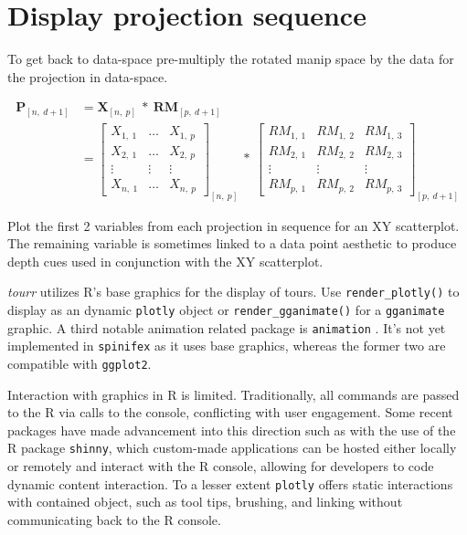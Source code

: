\documentclass{monashthesis}
\begin{document}
\section{Display projection
sequence}\label{display-projection-sequence-1}

To get back to data-space pre-multiply the rotated manip space by the
data for the projection in data-space.

\begin{align}
  \textbf{P}_{[n,~d+1]}
    &= \textbf{X}_{[n,~p]} ~*~ \textbf{RM}_{[p,~d+1]} \\
    &=
      \begin{bmatrix}
          X_{1,~1} & \dots & X_{1,~p} \\
          X_{2,~1} & \dots & X_{2,~p} \\
          \vdots   & \vdots & \vdots  \\
          X_{n,~1} & \dots & X_{n,~p}
      \end{bmatrix}_{[n,~p]}
      ~*~
      \begin{bmatrix}
        RM_{1,~1} & RM_{1,~2} & RM_{1,~3} \\
        RM_{2,~1} & RM_{2,~2} & RM_{2,~3} \\
        \vdots     & \vdots     & \vdots     \\
        RM_{p,~1} & RM_{p,~2} & RM_{p,~3}
      \end{bmatrix}_{[p,~d+1]}
\end{align}

Plot the first 2 variables from each projection in sequence for an XY
scatterplot. The remaining variable is sometimes linked to a data point
aesthetic to produce depth cues used in conjunction with the XY
scatterplot.

\emph{tourr} utilizes R's base graphics for the display of tours. Use
\texttt{render\_plotly()} to display as an dynamic \texttt{plotly}
\textcite{sievert_plotly_2018} object or \texttt{render\_gganimate()}
for a \texttt{gganimate} \textcite{pedersen_gganimate:_2019} graphic. A
third notable animation related package is \texttt{animation}
\textcite{xie_animation:_2018}. It's not yet implemented in
\texttt{spinifex} as it uses base graphics, whereas the former two are
compatible with \texttt{ggplot2}.

Interaction with graphics in R is limited. Traditionally, all commands
are passed to the R via calls to the console, conflicting with user
engagement. Some recent packages have made advancement into this
direction such as with the use of the R package \texttt{shinny}, which
custom-made applications can be hosted either locally or remotely and
interact with the R console, allowing for developers to code dynamic
content interaction. To a lesser extent \texttt{plotly} offers static
interactions with contained object, such as tool tips, brushing, and
linking without communicating back to the R console.
\end{document}

